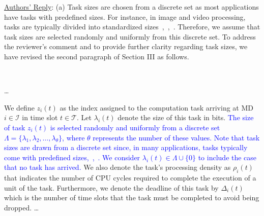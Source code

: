 \documentclass[12pt,draftclsnofoot,onecolumn]{IEEEtran}
\newcommand{\rev}[1]{{\color{blue}#1}} %
\newcommand{\rev}[1]{#1}
\newenvironment{my}[2]%
{\begin{list}{}%
{\setlength{\rightmargin}{#1}\setlength{\leftmargin}{#2}}%


 \item[]{}

} {\end{list}}
\begin{document}
\begin{enumerate}
\underline{Authors' Reply}: (a) Task sizes are chosen from a discrete set as most applications have tasks with predefined sizes. For instance, in image and video processing, tasks are typically divided into standardized sizes~\cite{wang2020intelligent},~\cite{zhang2019toward},~\cite{allahham2022multi}. Therefore, we assume that task sizes are selected randomly and uniformly from this discrete set. To address the reviewer’s comment and to provide further clarity regarding task sizes, we have revised the second paragraph of Section III as follows. \vspace{-3mm}
		\begin{my}{1cm}{1cm}
	\rev{
		{\
			
			 \dots

\color{black}
We define $z_i(t)$ as the index assigned to the computation task arriving at MD $i \in \mathcal{I}$ in time slot $t \in \mathcal{T}$. Let $\lambda_i(t)$ denote the size of this task in bits. \textcolor{blue}{The size of task \( z_i(t) \) is selected randomly and uniformly from a discrete set \( \Lambda = \{\lambda_1, \lambda_2, \ldots, \lambda_{\theta}\} \), where \( \theta \) represents the number of these values. Note that task sizes are drawn from a discrete set since, in many applications, tasks typically come with predefined sizes,~\cite{wang2020intelligent},~\cite{zhang2019toward}. We consider $\lambda_i(t) \in \Lambda \cup \{0\}$ to include the case that no task has arrived.} We also denote the task's processing density as $\rho_i(t)$ that indicates the number of CPU cycles required to complete the execution of a unit of the task. Furthermore, we denote the deadline of this task by $\Delta_i(t)$ which is the number of time slots that the task must be completed to avoid being dropped.
\dots




}}
\end{my} \vspace{3mm}

\setcounter{equation}{13}


\end{enumerate}
\end{document}
